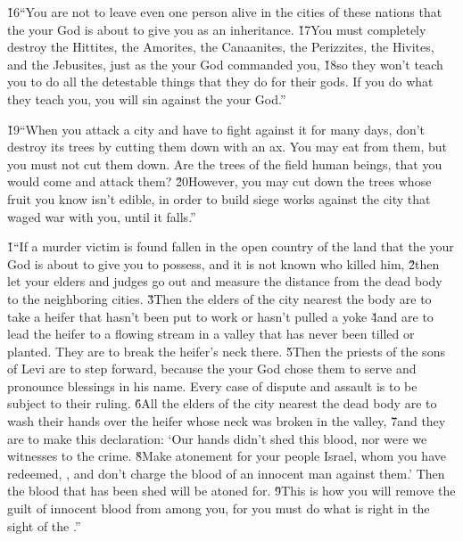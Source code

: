 \v{16}``You are not to leave even one person alive in the cities of these nations that the  your God is about to give you as an inheritance. \v{17}You must completely destroy the Hittites, the Amorites, the Canaanites, the Perizzites, the Hivites, and the Jebusites, just as the  your God commanded you, \v{18}so they won't teach you to do all the detestable things that they do for their gods. If you do what they teach you, you will sin against the  your God.''

\v{19}``When you attack a city and have to fight against it for many days, don't destroy its trees by cutting them down with an ax. You may eat from them, but you must not cut them down. Are the trees of the field human beings, that you would come and attack them? \v{20}However, you may cut down the trees whose fruit you know isn't edible, in order to build siege works against the city that waged war with you, until it falls.''

\v{1}``If a murder victim is found fallen in the open country of the land that the  your God is about to give you to possess, and it is not known who killed him, \v{2}then let your elders and judges go out and measure the distance from the dead body to the neighboring cities. \v{3}Then the elders of the city nearest the body are to take a heifer that hasn't been put to work or hasn't pulled a yoke \v{4}and are to lead the heifer to a flowing stream in a valley that has never been tilled or planted. They are to break the heifer's neck there. \v{5}Then the priests of the sons of Levi are to step forward, because the  your God chose them to serve and pronounce blessings in his name. Every case of dispute and assault is to be subject to their ruling. \v{6}All the elders of the city nearest the dead body are to wash their hands over the heifer whose neck was broken in the valley, \v{7}and they are to make this declaration: `Our hands didn't shed this blood, nor were we witnesses to the crime. \v{8}Make atonement for your people Israel, whom you have redeemed, , and don't charge the blood of an innocent man against them.' Then the blood that has been shed will be atoned for. \v{9}This is how you will remove the guilt of innocent blood from among you, for you must do what is right in the sight of the .''


